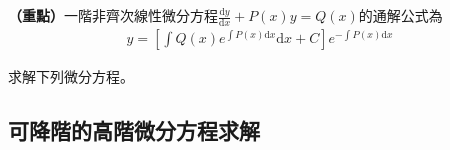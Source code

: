 \documentclass[12pt, addpoints]{exam}
\def \important{\textbf{（重點）}}
\def \d{\mathrm{d}}
\begin{document}
\begin{questions}

\question
\important 一階非齊次線性微分方程$\displaystyle \frac{\d y}{\d x} +P(x)y = Q(x)$的通解公式為
\begin{align*}
    y=\left[ \int Q(x) e^{\int P(x) \d x} \d x + C \right]e^{- \int P(x) \d x}
\end{align*}

\question
求解下列微分方程。
    
\end{questions}

\newpage %

\subsection{可降階的高階微分方程求解}
\end{document}
